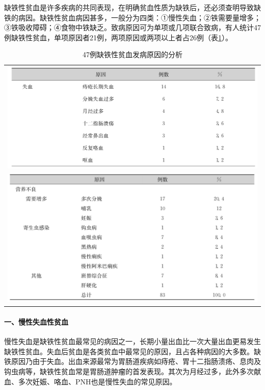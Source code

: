 缺铁性贫血是许多疾病的共同表现，在明确贫血性质为缺铁后，还必须查明导致缺铁的病因。缺铁性贫血病因甚多，一般分为四类：①慢性失血；②铁需要量增多；③铁吸收障碍；④食物中铁缺乏。致病原因可为单项或几项联合致病，有人统计47例缺铁性贫血，单项原因者21例，两项原因或两项以上者占26例（表\ref{tab33-10}）。

\begin{longtable}{c}
 \caption{47例缺铁性贫血发病原因的分析}
 \label{tab33-10}
 \endfirsthead
 \caption[]{47例缺铁性贫血发病原因的分析}
 \endhead
 \includegraphics[width=\textwidth,height=\textheight,keepaspectratio]{./images/Image00185.jpg}\\
 \includegraphics[width=\textwidth,height=\textheight,keepaspectratio]{./images/Image00186.jpg}
 \end{longtable}

\paragraph{一、慢性失血性贫血}

慢性失血是缺铁性贫血最常见的病因之一，长期小量出血比一次大量出血更易发生缺铁性贫血。失血后贫血是各类贫血中最常见的原因，且占各种病因的大多数。缺铁原因乃由于失血。出血来源最常为胃肠道疾病如痔疮、胃十二指肠溃疡、息肉及钩虫病等，缺铁性贫血常是胃肠道肿瘤的首发表现。其次为月经过多，此外多次献血、多次妊娠、咯血、PNH也是慢性失血的常见原因。

